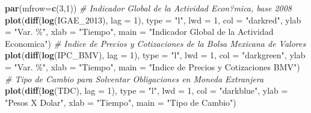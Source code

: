 \documentclass[
]{book}
\newenvironment{Shaded}{\begin{snugshade}}{\end{snugshade}}
\newcommand{\AttributeTok}[1]{\textcolor[rgb]{0.13,0.29,0.53}{#1}}
\newcommand{\CommentTok}[1]{\textcolor[rgb]{0.56,0.35,0.01}{\textit{#1}}}
\newcommand{\DecValTok}[1]{\textcolor[rgb]{0.00,0.00,0.81}{#1}}
\newcommand{\FunctionTok}[1]{\textcolor[rgb]{0.13,0.29,0.53}{\textbf{#1}}}
\newcommand{\NormalTok}[1]{#1}
\newcommand{\StringTok}[1]{\textcolor[rgb]{0.31,0.60,0.02}{#1}}
\begin{document}
\begin{Shaded}
\begin{Highlighting}[]
\FunctionTok{par}\NormalTok{(}\AttributeTok{mfrow=}\FunctionTok{c}\NormalTok{(}\DecValTok{3}\NormalTok{,}\DecValTok{1}\NormalTok{))}
\CommentTok{\# Indicador Global de la Actividad Econ?mica, base 2008}
\FunctionTok{plot}\NormalTok{(}\FunctionTok{diff}\NormalTok{(}\FunctionTok{log}\NormalTok{(IGAE\_2013), }\AttributeTok{lag =} \DecValTok{1}\NormalTok{), }\AttributeTok{type =} \StringTok{"l"}\NormalTok{, }\AttributeTok{lwd =} \DecValTok{1}\NormalTok{, }
     \AttributeTok{col =} \StringTok{"darkred"}\NormalTok{, }\AttributeTok{ylab =} \StringTok{"Var. \%"}\NormalTok{, }\AttributeTok{xlab =} \StringTok{"Tiempo"}\NormalTok{, }
     \AttributeTok{main =} \StringTok{"Indicador Global de la Actividad Economica"}\NormalTok{) }
\CommentTok{\# Indice de Precios y Cotizaciones de la Bolsa Mexicana de Valores}
\FunctionTok{plot}\NormalTok{(}\FunctionTok{diff}\NormalTok{(}\FunctionTok{log}\NormalTok{(IPC\_BMV), }\AttributeTok{lag =} \DecValTok{1}\NormalTok{), }\AttributeTok{type =} \StringTok{"l"}\NormalTok{, }\AttributeTok{lwd =} \DecValTok{1}\NormalTok{, }
     \AttributeTok{col =} \StringTok{"darkgreen"}\NormalTok{, }\AttributeTok{ylab =} \StringTok{"Var. \%"}\NormalTok{, }\AttributeTok{xlab =} \StringTok{"Tiempo"}\NormalTok{, }
     \AttributeTok{main =} \StringTok{"Indice de Precios y Cotizaciones BMV"}\NormalTok{)}
\CommentTok{\# Tipo de Cambio para Solventar Obligaciones en Moneda Extranjera}
\FunctionTok{plot}\NormalTok{(}\FunctionTok{diff}\NormalTok{(}\FunctionTok{log}\NormalTok{(TDC), }\AttributeTok{lag =} \DecValTok{1}\NormalTok{), }\AttributeTok{type =} \StringTok{"l"}\NormalTok{, }\AttributeTok{lwd =} \DecValTok{1}\NormalTok{, }
     \AttributeTok{col =} \StringTok{"darkblue"}\NormalTok{, }\AttributeTok{ylab =} \StringTok{"Pesos X Dolar"}\NormalTok{, }\AttributeTok{xlab =} \StringTok{"Tiempo"}\NormalTok{, }
     \AttributeTok{main =} \StringTok{"Tipo de Cambio"}\NormalTok{)}
\end{Highlighting}
\end{Shaded}
\end{document}
